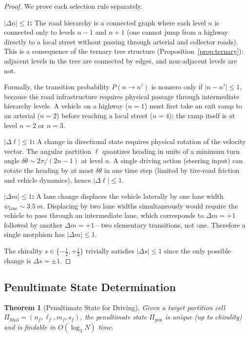 \documentclass[twocolumn,10pt]{article}
\newtheorem{theorem}{Theorem}[section]
\begin{document}
\begin{proof}
We prove each selection rule separately.

\textbf{$|\Delta n| \leq 1$:} The road hierarchy is a connected graph where each level $n$ is connected only to levels $n-1$ and $n+1$ (one cannot jump from a highway directly to a local street without passing through arterial and collector roads). This is a consequence of the ternary tree structure (Proposition~\ref{prop:ternary}): adjacent levels in the tree are connected by edges, and non-adjacent levels are not.

Formally, the transition probability $P(n \to n')$ is nonzero only if $|n - n'| \leq 1$, because the road infrastructure requires physical passage through intermediate hierarchy levels. A vehicle on a highway ($n = 1$) must first take an exit ramp to an arterial ($n = 2$) before reaching a local street ($n = 4$); the ramp itself is at level $n = 2$ or $n = 3$.

\textbf{$|\Delta \ell| \leq 1$:} A change in directional state requires physical rotation of the velocity vector. The angular partition $\ell$ quantizes heading in units of a minimum turn angle $\delta\theta \sim 2\pi/(2n-1)$ at level $n$. A single driving action (steering input) can rotate the heading by at most $\delta\theta$ in one time step (limited by tire-road friction and vehicle dynamics), hence $|\Delta \ell| \leq 1$.

\textbf{$|\Delta m| \leq 1$:} A lane change displaces the vehicle laterally by one lane width $w_{\mathrm{lane}} \sim \SI{3.5}{m}$. Displacing by two lane widths simultaneously would require the vehicle to pass through an intermediate lane, which corresponds to $\Delta m = +1$ followed by another $\Delta m = +1$---two elementary transitions, not one. Therefore a single morphism has $|\Delta m| \leq 1$.

The chirality $s \in \{-\frac{1}{2}, +\frac{1}{2}\}$ trivially satisfies $|\Delta s| \leq 1$ since the only possible change is $\Delta s = \pm 1$.
\end{proof}

\subsection{Penultimate State Determination}

\begin{theorem}[Penultimate State for Driving]\label{thm:penultimate}
Given a target partition cell $\Pi_{\mathrm{final}} = (n_f, \ell_f, m_f, s_f)$, the penultimate state $\Pi_{\mathrm{pen}}$ is unique (up to chirality) and is findable in $O(\log_3 N)$ time.
\end{theorem}
\end{document}
